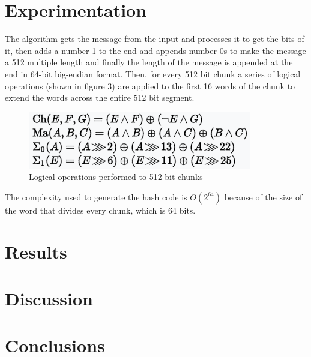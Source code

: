 \documentclass[journal]{IEEEtran}
\begin{document}
\section{Experimentation}
The algorithm gets the message from the input and processes it to get the bits of it, then adds a number 1 to the end and appends number 0s to make the message a 512 multiple length and finally the length of the message is appended at the end in 64-bit big-endian format. Then, for every 512 bit chunk a series of logical operations (shown in figure 3) are applied to the first 16 words of the chunk to extend the words across the entire 512 bit segment.
\begin{figure}[H] 
	\centering \includegraphics[width=.70\columnwidth]{logic.png}
	\caption{
		\label{fig:samplesetup}
		Logical operations performed to 512 bit chunks
	}
\end{figure}

The complexity used to generate the hash code is $O(2^{64})$ because of the size of the word that divides every chunk, which is 64 bits.
\section{Results}
\section{Discussion}
\section{Conclusions}
\end{document}
